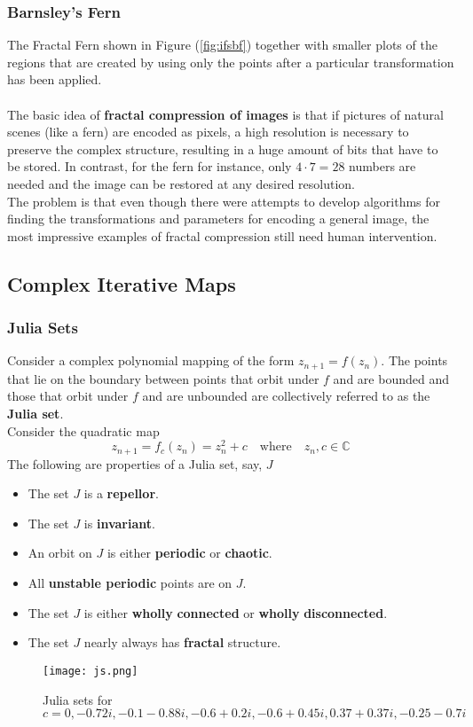 \subsubsection{Barnsley’s Fern}
The Fractal Fern shown in Figure (\ref{fig:ifsbf}) together with smaller plots of the regions that are created by using only the points after a particular transformation has been applied.\\\\
The basic idea of \textbf{fractal compression of images} is that if pictures of natural scenes (like a fern) are encoded as pixels, a high resolution is necessary to preserve the complex structure, resulting in a huge amount of bits that have to be stored.
In contrast, for the fern for instance, only $4\cdot7=28$ numbers are needed and the image can be restored at any desired resolution.\\
The problem is that even though there were attempts to develop algorithms for finding the transformations and parameters for encoding a general image, the most impressive examples of fractal compression still need human intervention.
\subsection{Complex Iterative Maps}
\subsubsection{Julia Sets}
Consider a complex polynomial mapping of the form $z_{n+1}=f(z_n)$.
The points that lie on the boundary between points that orbit under $f$ and are bounded and those that orbit under $f$ and are unbounded are collectively referred to as the \textbf{Julia set}.\\
Consider the quadratic map
\begin{equation}
	z_{n+1}=f_c(z_n)=z_n^2+c\quad\text{where}\quad z_n,c\in\mathbb{C}
\end{equation}
The following are properties of a Julia set, say, $J$
\begin{itemize}
	\item The set $J$ is a \textbf{repellor}. 
	\item The set $J$ is \textbf{invariant}. 
	\item An orbit on $J$ is either \textbf{periodic} or \textbf{chaotic}. 
	\item All \textbf{unstable periodic} points are on $J$. 
	\item The set $J$ is either \textbf{wholly} \textbf{connected} or \textbf{wholly} \textbf{disconnected}. 
	\item The set $J$ nearly always has \textbf{fractal} structure.
\end{itemize}
\begin{figure}[h!]
	\centering
	\texttt{[image: js.png]}
	\caption{Julia sets for $c=0,-0.72i,-0.1-0.88i,-0.6+0.2i,-0.6+0.45i,0.37+0.37i,-0.25-0.7i$}
	\label{fig:js}
\end{figure}
